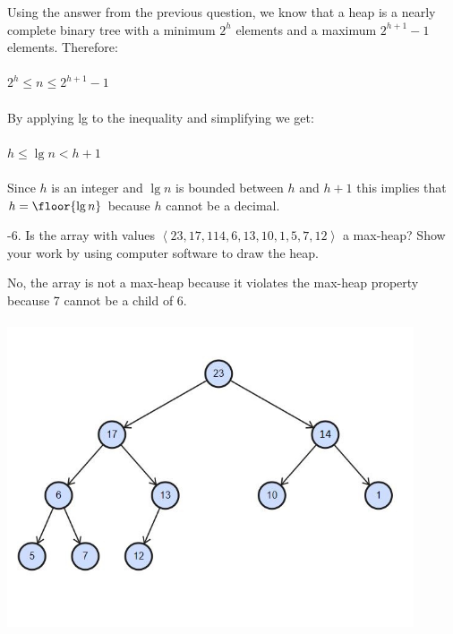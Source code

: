 \documentclass[addpoints,11pt]{exam}
\begin{document}
\begin{questions}
\begin{solutionorbox}
	Using the answer from the previous question, we know that a heap is a nearly complete binary tree with a minimum $2^h$ elements and a maximum $2^{h+1} - 1$ elements. Therefore:\\ \\
	$2^h \leq n \leq 2^{h+1} - 1$ \\ \\
	By applying lg to the inequality and simplifying we get: \\ \\
	$h \leq \lg n < h+1$ \\ \\ 
	Since $h$ is an integer and $\lg n$ is bounded between $h$ and $h + 1$ this implies that $h = \floor{\lg n}$ because $h$ cannot be a decimal.
\end{solutionorbox}

\ifprintanswers
\newpage
\else
\bigskip
\fi


%
%
-6.  Is the array with values $\left<23, 17, 114, 6, 13, 10, 1, 5, 7, 12\right>$ a max-heap?  Show your work by using computer software to draw the heap.

\begin{solutionorbox}
	No, the array is not a max-heap because it violates the max-heap property because 7 cannot be a child of 6. \\ \\ 
	\includegraphics[width=0.9\textwidth]{heap.JPG}
\end{solutionorbox}


\end{questions}
\end{document}
